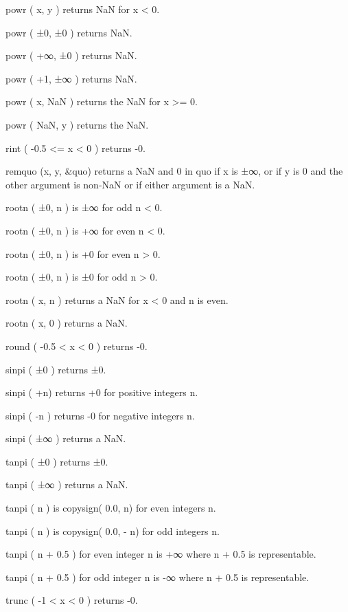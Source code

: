 powr ( x, y ) returns NaN for x < 0.\par
powr ( ±0, ±0 ) returns NaN.\par
powr ( +∞, ±0 ) returns NaN.\par
powr ( +1, ±∞ ) returns NaN.\par
powr ( x, NaN ) returns the NaN for x >= 0.\par
powr ( NaN, y ) returns the NaN.\par
\blank
rint ( -0.5 <= x < 0 ) returns -0.\par
\blank
remquo (x, y, &quo) returns a NaN and 0 in quo if x is ±∞,
or if y is 0 and the other argument is non-NaN or if either argument is a NaN.\par
\blank
rootn ( ±0, n ) is ±∞ for odd n < 0.\par
rootn ( ±0, n ) is +∞ for even n < 0.\par
rootn ( ±0, n ) is +0 for even n > 0.\par
rootn ( ±0, n ) is ±0 for odd n > 0.\par
rootn ( x, n ) returns a NaN for x < 0 and n is even.\par
rootn ( x, 0 ) returns a NaN.\par
\blank
round ( -0.5 < x < 0 ) returns -0.\par
\blank
sinpi ( ±0 ) returns ±0.\par
sinpi ( +n) returns +0 for positive integers n.\par
sinpi ( -n ) returns -0 for negative integers n.\par
sinpi ( ±∞ ) returns a NaN.\par
\blank
tanpi ( ±0 ) returns ±0.\par
tanpi ( ±∞ ) returns a NaN.\par
tanpi ( n ) is copysign( 0.0, n) for even integers n.\par
tanpi ( n ) is copysign( 0.0, - n) for odd integers n.\par
tanpi ( n + 0.5 ) for even integer n is +∞ where n + 0.5 is representable.\par
tanpi ( n + 0.5 ) for odd integer n is -∞ where n + 0.5 is representable.\par
\blank
trunc ( -1 < x < 0 ) returns -0.\par

